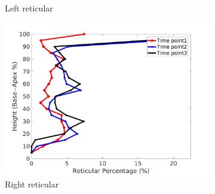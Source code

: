 \begin{figure}[H]
\begin{subfigure}{.42\linewidth}
  \caption{Left reticular}
  \label{fig:IPF3DiseaseAgainstHeight-c} 
\end{subfigure} 
\begin{subfigure}{.42\linewidth}%
  \includegraphics[width=\linewidth,trim={{.0\wd0} {.0\wd0} {.0\wd0} {.0\wd0}},clip]{Appendix/Image_AppexA/BaseToApex/IPF3RightLungReticularDiseaseAgainstHeight.jpg}
  \caption{Right reticular}
  \label{fig:IPF3DiseaseAgainstHeight-d}
\end{subfigure}
\begin{subfigure}{.42\linewidth}%

\end{subfigure}
\end{figure}
